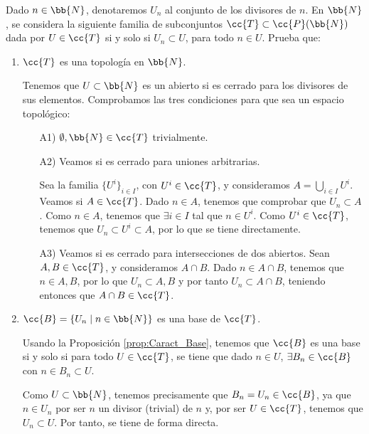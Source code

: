 \begin{ejercicio}\label{ej:3.1.10}
    Dado $n\in \bb{N}$, denotaremos $U_n$ al conjunto de los divisores de $n$. En $\bb{N}$, se considera la siguiente familia de subconjuntos $\cc{T}\subset \cc{P}(\bb{N})$ dada por $U\in \cc{T}$ si y solo si $U_n\subset U$, para todo $n\in U$. Prueba que:
    \begin{enumerate}[label=\alph*)]
        \item $\cc{T}$ es una topología en $\bb{N}$.

        Tenemos que $U\subset \bb{N}$ es un abierto si es cerrado para los divisores de sus elementos. Comprobamos las tres condiciones para que sea un espacio topológico:
        \begin{enumerate}[label=\alph*)]
            \item[A1)] $\emptyset,\bb{N} \in \cc{T}$ trivialmente.
            
            \item[A2)] Veamos si es cerrado para uniones arbitrarias.

            Sea la familia $\{U^i\}_{i\in I}$, con $U^i\in \cc{T}$, y consideramos $A=\bigcup\limits_{i\in I}U^i$. Veamos si $A\in \cc{T}$. Dado $n\in A$, tenemos que comprobar que $U_n\subset A$. Como $n\in A$, tenemos que $\exists i\in I$ tal que $n\in U^i$. Como $U^i\in \cc{T}$, tenemos que $U_n\subset U^i\subset A$, por lo que se tiene directamente.
    
            \item[A3)] Veamos si es cerrado para intersecciones de dos abiertos. Sean $A,B\in \cc{T}$, y consideramos $A\cap B$. Dado $n\in A\cap B$, tenemos que $n\in A,B$, por lo que $U_n\subset A,B$ y por tanto $U_n\subset A\cap B$, teniendo entonces que $A\cap B\in \cc{T}$.
        \end{enumerate}
    
        \item $\cc{B}=\{U_n\mid n\in \bb{N}\}$ es una base de $\cc{T}$.

        Usando la Proposición \ref{prop:Caract_Base}, tenemos que $\cc{B}$ es una base si y solo si para todo $U\in \cc{T}$, se tiene que dado $n\in U$, $\exists B_n\in \cc{B}$ con $n\in B_n\subset U$.

        Como $U\subset \bb{N}$, tenemos precisamente que $B_n=U_n\in \cc{B}$, ya que $n\in U_n$ por ser $n$ un divisor (trivial) de $n$ y, por ser $U\in \cc{T}$, tenemos que $U_n\subset U$. Por tanto, se tiene de forma directa.

        
    \end{enumerate}
\end{ejercicio}

